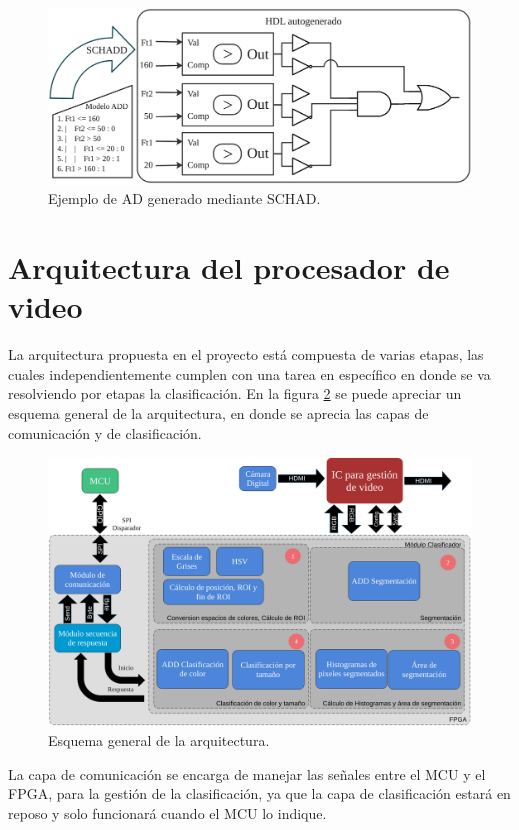 \documentclass[twoside,spanish,ESP,MSc]{plantillaLabUPV}
\theoremstyle{definition}
\begin{document}
\begin{figure} 
	\centering
	\includegraphics[width=0.9\linewidth]{edrawimas/addex}
	\caption{Ejemplo de AD generado mediante SCHAD.}
	\label{exschadd}
\end{figure}



\section{Arquitectura del procesador de video} \label{overlay}
La arquitectura propuesta en el proyecto está compuesta de varias etapas, las cuales independientemente cumplen con una tarea en específico en donde se va resolviendo por etapas la clasificación. En la figura \ref{fig:arqvid} se puede apreciar un esquema general de la arquitectura, en donde se aprecia las capas de comunicación y de clasificación.

\begin{figure}
	\centering
	\includegraphics[width=0.9\linewidth]{edrawimas/arquitectura}
	\caption{Esquema general de la arquitectura.}
	\label{fig:arqvid}
\end{figure}

La capa de comunicación se encarga de manejar las señales entre el MCU y el FPGA, para la gestión de la clasificación, ya que la capa de clasificación estará en reposo y solo funcionará cuando el MCU lo indique.\\
\end{document}

